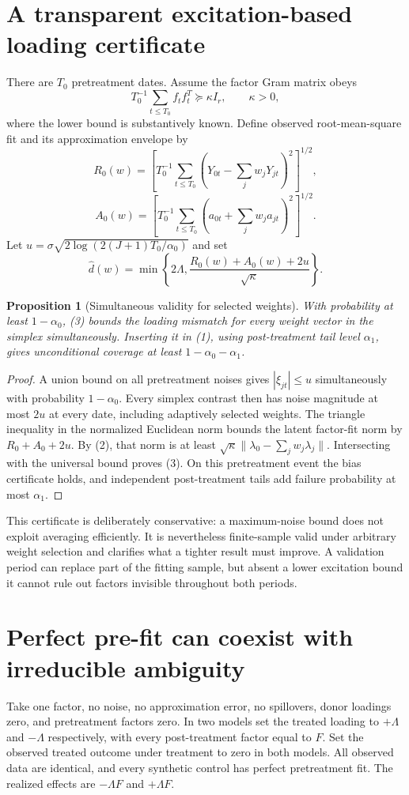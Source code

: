 \documentclass[11pt,a4paper]{article}
\newtheorem{proposition}[theorem]{Proposition}
\begin{document}
\section{A transparent excitation-based loading certificate}
There are $T_0$ pretreatment dates. Assume the factor Gram matrix obeys
\[
 T_0^{-1}\sum_{t\le T_0}f_tf_t^T\succeq\kappa I_r,
 \qquad\kappa>0, \tag{2}
\]
where the lower bound is substantively known. Define observed root-mean-square fit and its approximation envelope by
\[
 R_0(w)=\left[T_0^{-1}\sum_{t\le T_0}(Y_{0t}-\sum_jw_jY_{jt})^2\right]^{1/2},
\]
\[
 A_0(w)=\left[T_0^{-1}\sum_{t\le T_0}(a_{0t}+\sum_jw_ja_{jt})^2\right]^{1/2}.
\]
Let $u=\sigma\sqrt{2\log(2(J+1)T_0/\alpha_0)}$ and set
\[
 \widehat d(w)=\min\left\{2\Lambda,
             \frac{R_0(w)+A_0(w)+2u}{\sqrt\kappa}\right\}. \tag{3}
\]
\begin{proposition}[Simultaneous validity for selected weights]
With probability at least $1-\alpha_0$, (3) bounds the loading mismatch for every weight vector in the simplex simultaneously. Inserting it in (1), using post-treatment tail level $\alpha_1$, gives unconditional coverage at least $1-\alpha_0-\alpha_1$.
\end{proposition}
\begin{proof}
A union bound on all pretreatment noises gives $|\xi_{jt}|\le u$ simultaneously with probability $1-\alpha_0$. Every simplex contrast then has noise magnitude at most $2u$ at every date, including adaptively selected weights. The triangle inequality in the normalized Euclidean norm bounds the latent factor-fit norm by $R_0+A_0+2u$. By (2), that norm is at least $\sqrt\kappa\|\lambda_0-\sum_jw_j\lambda_j\|$. Intersecting with the universal bound proves (3). On this pretreatment event the bias certificate holds, and independent post-treatment tails add failure probability at most $\alpha_1$.
\end{proof}

This certificate is deliberately conservative: a maximum-noise bound does not exploit averaging efficiently. It is nevertheless finite-sample valid under arbitrary weight selection and clarifies what a tighter result must improve. A validation period can replace part of the fitting sample, but absent a lower excitation bound it cannot rule out factors invisible throughout both periods.

\section{Perfect pre-fit can coexist with irreducible ambiguity}
Take one factor, no noise, no approximation error, no spillovers, donor loadings zero, and pretreatment factors zero. In two models set the treated loading to $+\Lambda$ and $-\Lambda$ respectively, with every post-treatment factor equal to $F$. Set the observed treated outcome under treatment to zero in both models. All observed data are identical, and every synthetic control has perfect pretreatment fit. The realized effects are $-\Lambda F$ and $+\Lambda F$.
\end{document}
